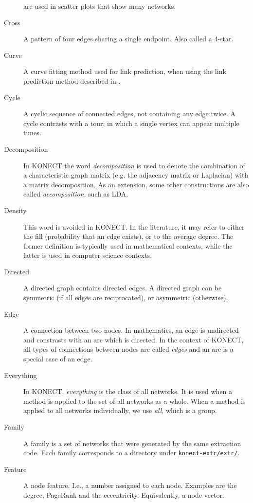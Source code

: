 \documentclass{article}
\begin{document}
\begin{description}
    are used in scatter plots that show many networks.  
  \item[Cross]
    A pattern of four edges sharing a single endpoint.  Also called a
    4-star.  
  \item[Curve]
    A curve fitting method used for link prediction, when using the link
    prediction method described
    in \citep{kunegis:spectral-transformation}.
  \item[Cycle] 
    A cyclic sequence of connected edges, not containing any edge twice.
    A cycle contrasts with a tour, in which a single vertex can appear
    multiple times.  
  \item[Decomposition] In KONECT the word \emph{decomposition} is used
    to denote the combination of a characteristic graph matrix (e.g. the
    adjacency matrix or Laplacian) with a matrix decomposition.  As an
    extension, some other constructions are also called
    \emph{decomposition}, such as LDA.
  \item[Density] This word is avoided in KONECT.  In the literature, it
    may refer to either the fill (probability that an edge exists), or to
    the average degree.  The former definition is typically used in mathematical
    contexts, while the latter is used in computer science contexts.
  \item[Directed] A directed graph contains directed edges.  A directed
    graph can be symmetric (if all edges are reciprocated), or
    asymmetric (otherwise). 
  \item[Edge] A connection between two nodes.  In mathematics, an edge
    is undirected and constrasts with an arc which is directed.  In the
    context of KONECT, all types of connections between nodes are called
    \emph{edges} and an arc is a special case of an edge. 
  \item[Everything] In KONECT, \emph{everything} is the class of all
    networks.  It is used when a method is applied to the set of all
    networks as a whole.  When a method is applied to all networks
    individually, we use \emph{all}, which is a group. 
  \item[Family] A family is a set of networks that were generated by the
    same extraction code.  Each family corresponds to a directory under \href{https://github.com/kunegis/konect-extr/tree/master/extr}{\texttt{konect-extr/extr/}}.
  \item[Feature] A node feature. I.e., a number assigned to each node.
    Examples are the degree, PageRank and the eccentricity. 
    Equivalently, a node vector.

\end{description}
\end{document}
